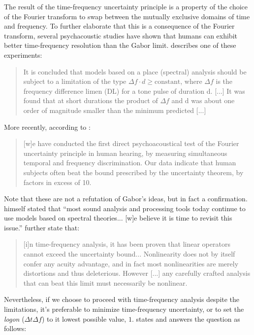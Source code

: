 \documentclass[report.tex]{subfiles}
\begin{document}
The result of the time-frequency uncertainty principle is a property of the choice of the Fourier transform to swap between the mutually exclusive domains of time and frequency. To further elaborate that this is a consequence of the Fourier transform, several psychacoustic studies have shown that humans can exhibit better time-frequency resolution than the Gabor limit. \textcite{psycho2} describes one of these experiments:

\begin{quote}
	It is concluded that models based on a place (spectral) analysis should be subject to a limitation of the type $\Delta f \cdot d \ge \text{constant}$, where $\Delta f$ is the frequency difference limen (DL) for a tone pulse of duration d. [...]  It was found that at short durations the product of $\Delta f$ and d was about one order of magnitude smaller than the minimum predicted [...]
\end{quote}

More recently, according to \textcite{psycho1}:

\begin{quote}
	[w]e have conducted the first direct psychoacoustical test of the Fourier uncertainty principle in human hearing, by measuring simultaneous temporal and frequency discrimination. Our data indicate that human subjects often beat the bound prescribed by the uncertainty theorem, by factors in excess of 10.
\end{quote}

Note that these are not a refutation of Gabor's ideas, but in fact a confirmation. \textcite{gabor1946} himself stated that ``most sound analysis and processing tools today continue to use models based on spectral theories... [w]e believe it is time to revisit this issue.'' \textcite{psycho1} further state that:

\begin{quote}
	[i]n time-frequency analysis, it has been proven that linear operators cannot exceed the uncertainty bound... Nonlinearity does not by itself confer any acuity advantage, and in fact most nonlinearities are merely distortions and thus deleterious. However [...] any carefully crafted analysis that can beat this limit must necessarily be nonlinear.
\end{quote}

Nevertheless, if we choose to proceed with time-frequency analysis despite the limitations, it's preferable to minimize time-frequency uncertainty, or to set the \textit{logon} ($\Delta t \Delta f$) to it lowest possible value, $1$. \textcite{gabor1946} states and answers the question as follows:
\end{document}
